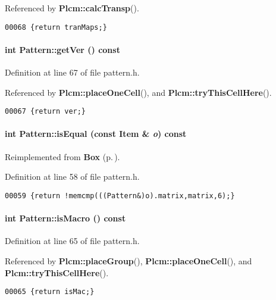 Referenced by {\bf Plcm::calc\-Transp}().\small\begin{verbatim}00068 {return tranMaps;}
\end{verbatim}\normalsize 
\label{Pattern_a10}
\paragraph{\setlength{\rightskip}{0pt plus 5cm}int Pattern::get\-Ver () const\hspace{0.3cm}{\tt  [inline]}}\hfill



Definition at line 67 of file pattern.h.

Referenced by {\bf Plcm::place\-One\-Cell}(), and {\bf Plcm::try\-This\-Cell\-Here}().\small\begin{verbatim}00067 {return ver;}
\end{verbatim}\normalsize 
\label{Pattern_a4}
\paragraph{\setlength{\rightskip}{0pt plus 5cm}int Pattern::is\-Equal (const {\bf Item} \& {\em o}) const\hspace{0.3cm}{\tt  [inline, virtual]}}\hfill



Reimplemented from {\bf Box} {\rm (p.\,\pageref{Box_a6})}.

Definition at line 58 of file pattern.h.\small\begin{verbatim}00059 {return !memcmp(((Pattern&)o).matrix,matrix,6);}
\end{verbatim}\normalsize 
\label{Pattern_a8}
\paragraph{\setlength{\rightskip}{0pt plus 5cm}int Pattern::is\-Macro () const\hspace{0.3cm}{\tt  [inline]}}\hfill



Definition at line 65 of file pattern.h.

Referenced by {\bf Plcm::place\-Group}(), {\bf Plcm::place\-One\-Cell}(), and {\bf Plcm::try\-This\-Cell\-Here}().\small\begin{verbatim}00065 {return isMac;}
\end{verbatim}\normalsize 
\label{Pattern_c2}
